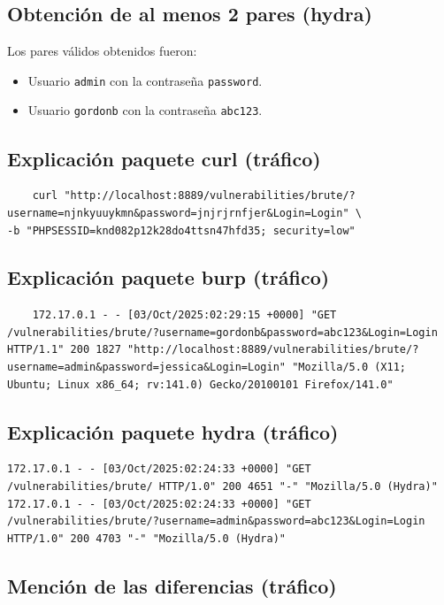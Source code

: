 \documentclass[letterpaper,12pt]{article}
\let\origsubsection\subsection
\renewcommand{\subsection}{\FloatBarrier\origsubsection}
\begin{document}
\subsection{Obtención de al menos 2 pares (hydra)}

Los pares válidos obtenidos fueron:
\begin{itemize}
        \item Usuario \texttt{admin} con la contraseña \texttt{password}.
        \item Usuario \texttt{gordonb} con la contraseña \texttt{abc123}.
\end{itemize}


\subsection{Explicación paquete curl (tráfico)}
\begin{verbatim}
    curl "http://localhost:8889/vulnerabilities/brute/?username=njnkyuuykmn&password=jnjrjrnfjer&Login=Login" \
-b "PHPSESSID=knd082p12k28do4ttsn47hfd35; security=low"
\end{verbatim}
\subsection{Explicación paquete burp (tráfico)}
\begin{verbatim}
    172.17.0.1 - - [03/Oct/2025:02:29:15 +0000] "GET /vulnerabilities/brute/?username=gordonb&password=abc123&Login=Login HTTP/1.1" 200 1827 "http://localhost:8889/vulnerabilities/brute/?username=admin&password=jessica&Login=Login" "Mozilla/5.0 (X11; Ubuntu; Linux x86_64; rv:141.0) Gecko/20100101 Firefox/141.0"
\end{verbatim}
\subsection{Explicación paquete hydra (tráfico)}
\begin{Verbatim}[breaklines=true,breakanywhere=true]
172.17.0.1 - - [03/Oct/2025:02:24:33 +0000] "GET /vulnerabilities/brute/ HTTP/1.0" 200 4651 "-" "Mozilla/5.0 (Hydra)"
172.17.0.1 - - [03/Oct/2025:02:24:33 +0000] "GET /vulnerabilities/brute/?username=admin&password=abc123&Login=Login HTTP/1.0" 200 4703 "-" "Mozilla/5.0 (Hydra)"
\end{Verbatim}

\subsection{Mención de las diferencias (tráfico)}
\end{document}
